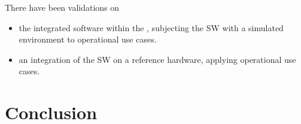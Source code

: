 \documentclass{template/openetcs_article}
\begin{document}
There have been validations on
\begin{itemize}
\item the integrated software within the , subjecting the SW with a simulated environment to
  operational use cases.
\item an integration of the SW on a reference hardware, applying
  operational use cases.  
\end{itemize}

\section{Conclusion}
\label{sec:conclusion}









\end{document}
